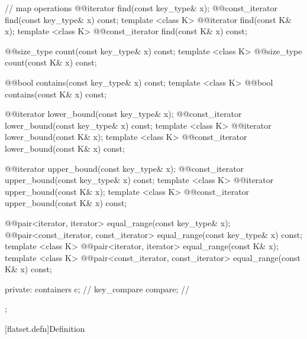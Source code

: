 \begin{codeblock}
{{    // map operations
    @@iterator find(const key_type& x);
    @@const_iterator find(const key_type& x) const;
    template <class K> @@iterator find(const K& x);
    template <class K> @@const_iterator find(const K& x) const;

    @@size_type count(const key_type& x) const;
    template <class K> @@size_type count(const K& x) const;

    @@bool contains(const key_type& x) const;
    template <class K> @@bool contains(const K& x) const;

    @@iterator lower_bound(const key_type& x);
    @@const_iterator lower_bound(const key_type& x) const;
    template <class K> @@iterator lower_bound(const K& x);
    template <class K> @@const_iterator lower_bound(const K& x) const;

    @@iterator upper_bound(const key_type& x);
    @@const_iterator upper_bound(const key_type& x) const;
    template <class K> @@iterator upper_bound(const K& x);
    template <class K> @@const_iterator upper_bound(const K& x) const;

    @@pair<iterator, iterator> equal_range(const key_type& x);
    @@pair<const_iterator, const_iterator> equal_range(const key_type& x) const;
    template <class K>
      @@pair<iterator, iterator> equal_range(const K& x);
    template <class K>
      @@pair<const_iterator, const_iterator> equal_range(const K& x) const;

  private:
    containers c;        // \expos
    key_compare compare; // \expos
  };
}
\end{codeblock}

\noindent\makebox[\linewidth]{\rule{\textwidth}{0.4pt}}

\setcounter{subsection}{11}
\setcounter{subsubsection}{0}
[flatset.defn]{Definition}

